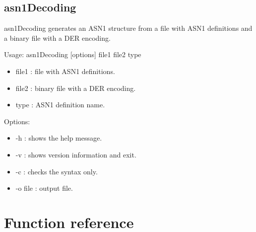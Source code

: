 \documentclass{book}
\begin{document}
\section{asn1Decoding}
asn1Decoding generates an ASN1 structure from a file with ASN1 definitions
and a binary file with a DER encoding.
\par
Usage:  asn1Decoding [options] file1 file2 type
\begin{itemize}
\item file1 : file with ASN1 definitions.
\item file2 : binary file with a DER encoding.
\item type : ASN1 definition name.
\end{itemize}
 

\par
Options:
\begin{itemize}
\item -h : shows the help message.
\item -v : shows version information and exit.
\item -c : checks the syntax only.
\item -o file : output file.
\end{itemize} 

\chapter{Function reference}



\end{document}
